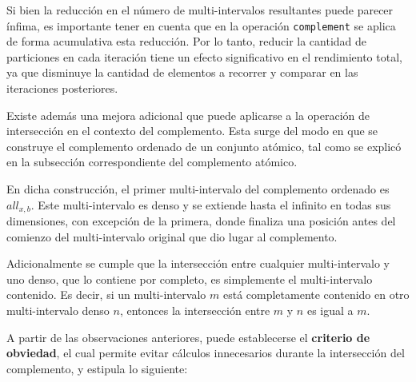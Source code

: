 Si bien la reducción en el número de multi-intervalos resultantes puede parecer ínfima, es importante tener en cuenta que en la operación \texttt{complement} se aplica de forma acumulativa esta reducción. Por lo tanto, reducir la cantidad de particiones en cada iteración tiene un efecto significativo en el rendimiento total, ya que disminuye la cantidad de elementos a recorrer y comparar en las iteraciones posteriores.

Existe además una mejora adicional que puede aplicarse a la operación de intersección en el contexto del complemento. Esta surge del modo en que se construye el complemento ordenado de un conjunto atómico, tal como se explicó en la subsección correspondiente del complemento atómico.

En dicha construcción, el primer multi-intervalo del complemento ordenado es $\textit{all}_{x,b}$. Este multi-intervalo es denso y se extiende hasta el infinito en todas sus dimensiones, con excepción de la primera, donde finaliza una posición antes del comienzo del multi-intervalo original que dio lugar al complemento.

Adicionalmente se cumple que la intersección entre cualquier multi-intervalo y uno denso, que lo contiene por completo, es simplemente el multi-intervalo contenido. Es decir, si un multi-intervalo $m$ está completamente contenido en otro multi-intervalo denso $n$, entonces la intersección entre $m$ y $n$ es igual a $m$.

A partir de las observaciones anteriores, puede establecerse el \textbf{criterio de obviedad}, el cual permite evitar cálculos innecesarios durante la intersección del complemento, y estipula lo siguiente:

\begin{center}
\end{center}


